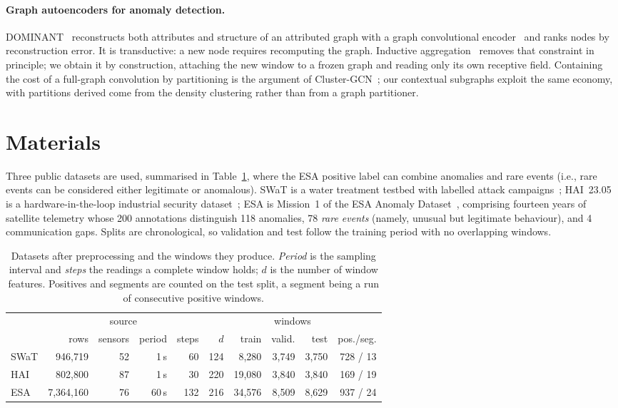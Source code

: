 \documentclass{article}
\begin{document}
\paragraph{Graph autoencoders for anomaly detection.} DOMINANT~\cite{ding2019dominant}
reconstructs both attributes and structure of an attributed graph with a graph
convolutional encoder~\cite{kipf2017gcn} and ranks nodes by reconstruction error. It is
transductive: a new node requires recomputing the graph. Inductive
aggregation~\cite{hamilton2017graphsage} removes that constraint in principle; we obtain
it by construction, attaching the new window to a frozen graph and reading only its own
receptive field. Containing the cost of a full-graph convolution by partitioning is the
argument of Cluster-GCN~\cite{chiang2019clustergcn}; our contextual subgraphs exploit the
same economy, with partitions derived come from the density clustering rather than from a
graph partitioner.


\section{Materials}

Three public datasets are used, summarised in Table~\ref{tab:data}, where the ESA positive label can combine anomalies and rare events 
(i.e., rare events can be considered either legitimate or anomalous). 
SWaT is a water treatment testbed with labelled attack campaigns~\cite{mathur2016swat}; HAI~23.05 is a
hardware-in-the-loop industrial security dataset~\cite{shin2020hai}; ESA is Mission~1 of
the ESA Anomaly Dataset~\cite{kotowski2024esa}, comprising fourteen years of satellite telemetry
whose 200 annotations distinguish 118 anomalies, 78 \emph{rare events} (namely, unusual but legitimate behaviour), 
and 4 communication gaps. Splits are chronological, so validation and test follow the training period with no overlapping windows.

\begin{table}[t]
  \caption{Datasets after preprocessing and the windows they produce. \emph{Period} is the
  sampling interval and \emph{steps} the readings a complete window holds; $d$ is the number
  of window features. Positives and segments are counted on the test split, a segment being a run of consecutive positive windows.}
  \centering
  \small
  \setlength{\tabcolsep}{4pt}
  \begin{tabular}{lrrrrrrrrr}
    \toprule
    & \multicolumn{4}{c}{source} & \multicolumn{5}{c}{windows} \\
    \cmidrule(lr){2-5} \cmidrule(lr){6-10}
    & rows & sensors & period & steps & $d$ & train & valid. & test & pos./seg. \\
    \midrule
    SWaT &   946{,}719 & 52 &  1\,s &  60 & 124 &  8{,}280 & 3{,}749 & 3{,}750 & 728 / 13 \\
    HAI  &   802{,}800 & 87 &  1\,s &  30 & 220 & 19{,}080 & 3{,}840 & 3{,}840 & 169 / 19 \\
    ESA  & 7{,}364{,}160 & 76 & 60\,s & 132 & 216 & 34{,}576 & 8{,}509 & 8{,}629 & 937 / 24 \\
    \bottomrule
  \end{tabular}
  \label{tab:data}
\end{table}
\end{document}

